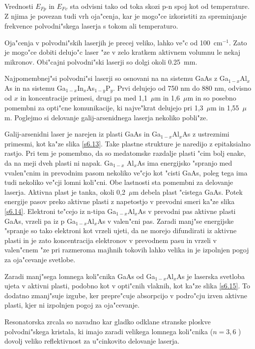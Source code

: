 Vrednosti $E_{Fp}$ in $E_{Fv}$ sta odvisni tako od toka skozi p-n spoj kot
od temperature. Z njima je povezan tudi vrh oja"cenja, kar je mogo"ce
izkoristiti za spreminjanje frekvence polvodni"skega laserja s tokom ali
temperaturo.

Oja"cenja v polvodni"skih laserjih je precej veliko, lahko ve"c od 100~cm$%
^{-1}$. Zato je mogo"ce dobiti delujo"c laser "ze v zelo kratkem aktivnem
volumnu le nekaj mikronov. Obi"cajni polvodni"ski laserji so dolgi okoli
0.25~mm.

Najpomembnej"si polvodni"si laserji so osnovani na na sistemu GaAs z Ga$%
_{1-x}$Al$_{x}$As in na sistemu Ga$_{1- x}$In$_{x}$As$_{1-y}$P$_y$. Prvi
delujejo od 750 nm do 880 nm, odvisno od $x$ in koncentracije primesi, drugi
pa med 1,1~$\mu$m in 1,6~$\mu$m in so posebno pomembni za opti"cne
komunikacije, ki najve"krat delujejo pri 1,3~$\mu$m in 1,55~$\mu$m. Poglejmo
si delovanje galij-arsenidnega laserja nekoliko pobli"ze.

Galij-arsenidni laser je narejen iz plasti GaAs in Ga$_{1- x}$Al$_x$As z
ustreznimi primesmi, kot ka"ze slika \ref{s6.13}. Take plastne strukture je
naredijo z epitaksialno rastjo. Pri tem je pomembno, da so medatomske
razdalje plasti "cim bolj enake, da na meji dveh plasti ni napak. Ga$_{1-x}$%
Al$_x$As ima energijsko "spranjo med vvalen"cnim in prevodnim pasom nekoliko
ve"cjo kot "cisti GaAs, poleg tega ima tudi nekoliko ve"cji lomni koli"cni.
Obe lastnosti sta pomembni za delovanje laserja. Aktivna plast je tanka,
okoli 0,2~$\mu$m debela plast "cistega GaAs. Potek energije pasov preko
aktivne plasti z napetostjo v prevodni smeri ka"ze slika \ref{s6.14}.
Elektroni te"cejo iz n-tipa Ga$_{1-x}$Al$_x$As v prevodni pas aktivne plasti
GaAs, vrzeli pa iz p Ga$_{1-x}$Al$_x$As v valen"cni pas. Zaradi manj"se
energijske "spranje so tako elektroni kot vrzeli ujeti, da ne morejo
difundirati iz aktivne plasti in je zato koncentracija elektronov v
prevodnem pasu in vrzeli v valen"cnem "ze pri razmeroma majhnih tokovih
lahko velika in je izpolnjen pogoj za oja"cevanje svetlobe.

Zaradi manj"sega lomnega koli"cnika GaAs od Ga$_{1- x}$Al$_x$As je laserska
svetloba ujeta v aktivni plasti, podobno kot v opti"cnih vlaknih, kot ka"ze
slika \ref{s6.15}. To dodatno zmanj"suje izgube, ker prepre"cuje absorpcijo
v podro"cju izven aktivne plasti, kjer ni izpolnjen pogoj za oja"cevanje.

Resonatorska zrcala so navadno kar gladko odklane stranske ploskve
polvodni"skega kristala, ki imajo zaradi velikega lomnega koli"cnika ($n=3,6$%
) dovolj veliko reflektivnost za u"cinkovito delovanje laserja.

